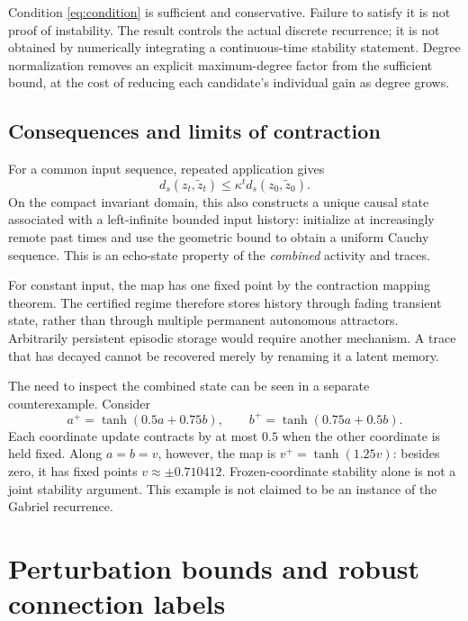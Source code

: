 \documentclass[11pt,a4paper]{article}
\theoremstyle{definition}\newtheorem{definition}[theorem]{Definition}
\begin{document}
Condition \eqref{eq:condition} is sufficient and conservative. Failure to satisfy it is not proof of instability. The result controls the actual discrete recurrence; it is not obtained by numerically integrating a continuous-time stability statement. Degree normalization removes an explicit maximum-degree factor from the sufficient bound, at the cost of reducing each candidate's individual gain as degree grows.

\subsection{Consequences and limits of contraction}
For a common input sequence, repeated application gives
\begin{equation}
 d_s(z_t,\widetilde z_t)\leq\kappa^t d_s(z_0,\widetilde z_0). \label{eq:sync}
\end{equation}
On the compact invariant domain, this also constructs a unique causal state associated with a left-infinite bounded input history: initialize at increasingly remote past times and use the geometric bound to obtain a uniform Cauchy sequence. This is an echo-state property of the \emph{combined} activity and traces.

For constant input, the map has one fixed point by the contraction mapping theorem. The certified regime therefore stores history through fading transient state, rather than through multiple permanent autonomous attractors. Arbitrarily persistent episodic storage would require another mechanism. A trace that has decayed cannot be recovered merely by renaming it a latent memory.

The need to inspect the combined state can be seen in a separate counterexample. Consider
\[
 a^+=\tanh(0.5a+0.75b),\qquad b^+=\tanh(0.75a+0.5b).
\]
Each coordinate update contracts by at most $0.5$ when the other coordinate is held fixed. Along $a=b=v$, however, the map is $v^+=\tanh(1.25v)$: besides zero, it has fixed points $v\approx\pm0.710412$. Frozen-coordinate stability alone is not a joint stability argument. This example is not claimed to be an instance of the Gabriel recurrence.

\section{Perturbation bounds and robust connection labels}
\end{document}
